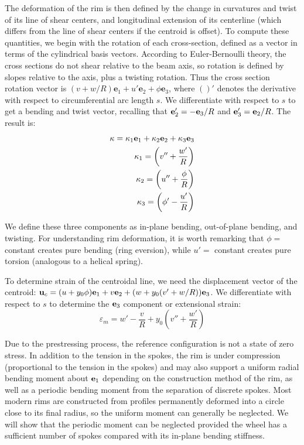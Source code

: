 \documentclass[\rootdir/thesis.tex]{subfiles}
\begin{document}
The deformation of the rim is then defined by the change in curvatures and twist of its line of shear centers, and longitudinal extension of its centerline (which differs from the line of shear centers if the centroid is offset). To compute these quantities, we begin with the rotation of each cross-section, defined as a vector in terms of the cylindrical basis vectors. According to Euler-Bernoulli theory, the cross sections do not shear relative to the beam axis, so rotation is defined by slopes relative to the axis, plus a twisting rotation. Thus the cross section rotation vector is $(v + w/R) \mathbf{e}_1 + u' \mathbf{e}_2 + \phi\mathbf{e}_3$, where $()'$ denotes the derivative with respect to circumferential arc length $s$. We differentiate with respect to $s$ to get a bending and twist vector, recalling that $\mathbf{e}_2' = -\mathbf{e}_3/R$ and $\mathbf{e}_3' = \mathbf{e}_2/R$. The result is:
\begin{subequations}
\label{eq:kappa}
\begin{align}
\mathbf{\kappa} = \kappa_1\mathbf{e}_1 + \kappa_2\mathbf{e}_2 + \kappa_3\mathbf{e}_3\\
\kappa_1 = \left( v'' + \frac{w'}{R} \right) \label{eq:kappa1}\\
\kappa_2 = \left( u'' + \frac{\phi}{R} \right) \label{eq:kappa2}\\
\kappa_3 = \left( \phi' - \frac{u'}{R} \right) \label{eq:kappa3}
\end{align}
\end{subequations}

We define these three components as in-plane bending, out-of-plane bending, and twisting. For understanding rim deformation, it is worth remarking that $\phi=$ constant creates pure bending (ring eversion), while $u'=$ constant creates pure torsion (analogous to a helical spring).

To determine strain of the centroidal line, we need the displacement vector of the centroid: $\mathbf{u}_c = (u+y_0\phi)\mathbf{e}_1 + v\mathbf{e}_2 + (w+y_0 (v'+w/R))\mathbf{e}_3$. We differentiate with respect to $s$ to determine the $\mathbf{e}_3$ component or extensional strain:
\begin{equation}
\label{eq:mem_strain}
\varepsilon_m = w' - \frac{v}{R} + y_0\left(v'' + \frac{w'}{R} \right)
\end{equation}

Due to the prestressing process, the reference configuration is not a state of zero stress. In addition to the tension in the spokes, the rim is under compression\cite{Sharp} (proportional to the tension in the spokes) and may also support a uniform radial bending moment about $\mathbf{e}_1$ depending on the construction method of the rim, as well as a periodic bending moment from the separation of discrete spokes. Most modern rims are constructed from profiles permanently deformed into a circle close to its final radius, so the uniform moment can generally be neglected. We will show that the periodic moment can be neglected provided the wheel has a sufficient number of spokes compared with its in-plane bending stiffness.
\end{document}
